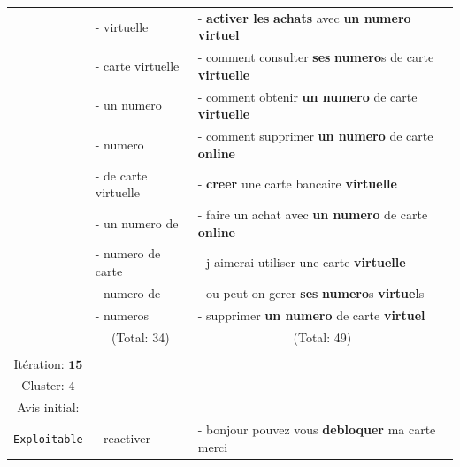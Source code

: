 \begin{table}[!htb]
\begin{center}
\begin{tabular}{|c|l|l|}
						& { \scriptsize - virtuelle }
						& { \scriptsize - \textbf{activer les} \textbf{achats} avec \textbf{un numero} \textbf{virtuel} }
						\tabularnewline
						
						& { \scriptsize - carte virtuelle }
						& { \scriptsize - comment consulter \textbf{ses} \textbf{numero}s de carte \textbf{virtuelle} }
						\tabularnewline
						
						& { \scriptsize - un numero }
						& { \scriptsize - comment obtenir \textbf{un numero} de carte \textbf{virtuelle} }
						\tabularnewline
						
						& { \scriptsize - numero }
						& { \scriptsize - comment supprimer \textbf{un numero} de carte \textbf{online} }
						\tabularnewline
						
						& { \scriptsize - de carte virtuelle }
						& { \scriptsize - \textbf{creer} une carte bancaire \textbf{virtuelle} }
						\tabularnewline
						
						& { \scriptsize - un numero de }
						& { \scriptsize - faire un achat avec \textbf{un numero} de carte \textbf{online} }
						\tabularnewline
						
						& { \scriptsize - numero de carte }
						& { \scriptsize - j aimerai utiliser une carte \textbf{virtuelle} }
						\tabularnewline
						
						& { \scriptsize - numero de }
						& { \scriptsize - ou peut on gerer \textbf{ses} \textbf{numero}s \textbf{virtuel}s }
						\tabularnewline
						
						& { \scriptsize - numeros }
						& { \scriptsize - supprimer \textbf{un numero} de carte \textbf{virtuel} }
						\tabularnewline
						
						& \multicolumn{1}{c|}{
							\scriptsize (Total: 34)
						}
						& \multicolumn{1}{c|}{
							\scriptsize (Total: 49)
						}
						\tabularnewline
						\hdashline

					\multirow{10}{*}{\shortstack[c]{
						{ \footnotesize Tentative: $1$ } \\
						{ \footnotesize Itération: $\textbf{15}$ } \\
						{ \footnotesize Cluster: $4$ } \\
						{ \footnotesize Avis initial: } \\
						{ \footnotesize \color{colorDarkPastelGreen} \texttt{Exploitable} }
					}}
						
						& { \scriptsize - reactiver }
						& { \scriptsize - bonjour pouvez vous \textbf{debloquer} ma carte merci }
						\tabularnewline
						

\end{tabular}
\end{center}
\end{table}
